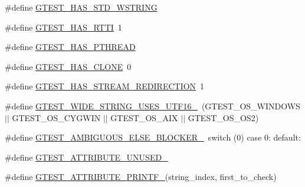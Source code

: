 \begin{DoxyCompactItemize}
\#define \mbox{\hyperlink{_obj__test_2lib_2googletest-master_2googletest_2include_2gtest_2internal_2gtest-port_8h_a6e087748d8bbd2ca57c487b6ad268670}{G\+T\+E\+S\+T\+\_\+\+H\+A\+S\+\_\+\+S\+T\+D\+\_\+\+W\+S\+T\+R\+I\+NG}}
\item 
\#define \mbox{\hyperlink{_obj__test_2lib_2googletest-master_2googletest_2include_2gtest_2internal_2gtest-port_8h_a9ba781217167f905bff2f1c410a97930}{G\+T\+E\+S\+T\+\_\+\+H\+A\+S\+\_\+\+R\+T\+TI}}~1
\item 
\#define \mbox{\hyperlink{_obj__test_2lib_2googletest-master_2googletest_2include_2gtest_2internal_2gtest-port_8h_a3341397e1952de0b9cd88762d4d3ae4b}{G\+T\+E\+S\+T\+\_\+\+H\+A\+S\+\_\+\+P\+T\+H\+R\+E\+AD}}
\item 
\#define \mbox{\hyperlink{_obj__test_2lib_2googletest-master_2googletest_2include_2gtest_2internal_2gtest-port_8h_a40c075a7f969a694e59532356be59fd5}{G\+T\+E\+S\+T\+\_\+\+H\+A\+S\+\_\+\+C\+L\+O\+NE}}~0
\item 
\#define \mbox{\hyperlink{_obj__test_2lib_2googletest-master_2googletest_2include_2gtest_2internal_2gtest-port_8h_add695166eb7b691f93777525d5881062}{G\+T\+E\+S\+T\+\_\+\+H\+A\+S\+\_\+\+S\+T\+R\+E\+A\+M\+\_\+\+R\+E\+D\+I\+R\+E\+C\+T\+I\+ON}}~1
\item 
\#define \mbox{\hyperlink{_obj__test_2lib_2googletest-master_2googletest_2include_2gtest_2internal_2gtest-port_8h_a0e3904ca8d62334ab5f29c057dceb6a1}{G\+T\+E\+S\+T\+\_\+\+W\+I\+D\+E\+\_\+\+S\+T\+R\+I\+N\+G\+\_\+\+U\+S\+E\+S\+\_\+\+U\+T\+F16\+\_\+}}~(G\+T\+E\+S\+T\+\_\+\+O\+S\+\_\+\+W\+I\+N\+D\+O\+WS $\vert$$\vert$ G\+T\+E\+S\+T\+\_\+\+O\+S\+\_\+\+C\+Y\+G\+W\+IN $\vert$$\vert$ G\+T\+E\+S\+T\+\_\+\+O\+S\+\_\+\+A\+IX $\vert$$\vert$ G\+T\+E\+S\+T\+\_\+\+O\+S\+\_\+\+O\+S2)
\item 
\#define \mbox{\hyperlink{_obj__test_2lib_2googletest-master_2googletest_2include_2gtest_2internal_2gtest-port_8h_a00b3684a621ce1422b55a0e7e8a6aecb}{G\+T\+E\+S\+T\+\_\+\+A\+M\+B\+I\+G\+U\+O\+U\+S\+\_\+\+E\+L\+S\+E\+\_\+\+B\+L\+O\+C\+K\+E\+R\+\_\+}}~switch (0) case 0\+: default\+:
\item 
\#define \mbox{\hyperlink{_obj__test_2lib_2googletest-master_2googletest_2include_2gtest_2internal_2gtest-port_8h_acdd47601a9376161c349a5881ccc6918}{G\+T\+E\+S\+T\+\_\+\+A\+T\+T\+R\+I\+B\+U\+T\+E\+\_\+\+U\+N\+U\+S\+E\+D\+\_\+}}
\item 
\#define \mbox{\hyperlink{_obj__test_2lib_2googletest-master_2googletest_2include_2gtest_2internal_2gtest-port_8h_ae29b00ca46783509cc900cd03d61ef37}{G\+T\+E\+S\+T\+\_\+\+A\+T\+T\+R\+I\+B\+U\+T\+E\+\_\+\+P\+R\+I\+N\+T\+F\+\_\+}}(string\+\_\+index,  first\+\_\+to\+\_\+check)
$$
\end{DoxyCompactItemize}
